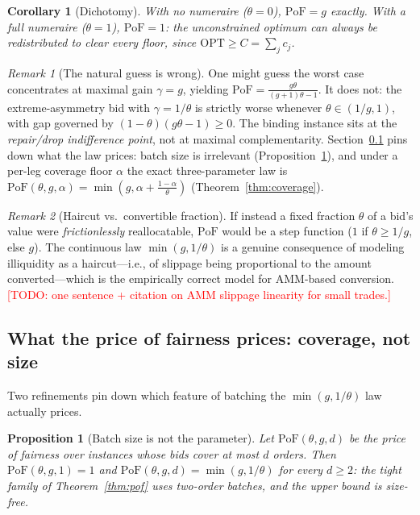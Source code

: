 \documentclass[11pt]{article}
\newcommand{\todo}[1]{\textcolor{red}{[TODO: #1]}}
\newtheorem{proposition}{Proposition}
\newtheorem{corollary}{Corollary}
\theoremstyle{remark}
\newtheorem{remark}{Remark}
\newcommand{\OPT}{\mathrm{OPT}}
\newcommand{\PoF}{\mathrm{PoF}}
\begin{document}
\begin{corollary}[Dichotomy]\label{cor:dichotomy}
With no numeraire ($\theta=0$), $\PoF=g$ exactly. With a full numeraire
($\theta=1$), $\PoF=1$: the unconstrained optimum can always be
redistributed to clear every floor, since $\OPT\ge C=\sum_j c_j$.
\end{corollary}

\begin{remark}[The natural guess is wrong]\label{rem:wrongguess}
One might guess the worst case concentrates at maximal gain $\gamma=g$,
yielding $\PoF=\frac{g\theta}{(g+1)\theta-1}$. It does not: the
extreme-asymmetry bid with $\gamma=1/\theta$ is strictly worse whenever
$\theta\in(1/g,1)$, with gap governed by $(1-\theta)(g\theta-1)\ge0$. The
binding instance sits at the \emph{repair/drop indifference point}, not at
maximal complementarity. Section~\ref{sec:coverage} pins down what the
law prices: batch size is irrelevant (Proposition~\ref{prop:dirrel}),
and under a per-leg coverage floor $\alpha$ the exact three-parameter
law is $\PoF(\theta,g,\alpha)=\min(g,\alpha+\frac{1-\alpha}{\theta})$
(Theorem~\ref{thm:coverage}).
\end{remark}

\begin{remark}[Haircut vs.\ convertible fraction]\label{rem:haircut}
If instead a fixed fraction $\theta$ of a bid's value were
\emph{frictionlessly} reallocatable, $\PoF$ would be a step function ($1$ if
$\theta\ge1/g$, else $g$). The continuous law $\min(g,1/\theta)$ is a
genuine consequence of modeling illiquidity as a haircut---i.e., of slippage
being proportional to the amount converted---which is the empirically
correct model for AMM-based conversion. \todo{one sentence + citation on
AMM slippage linearity for small trades.}
\end{remark}

\subsection{What the price of fairness prices: coverage, not size}
\label{sec:coverage}

Two refinements pin down which feature of batching the
$\min(g,1/\theta)$ law actually prices.

\begin{proposition}[Batch size is not the parameter]\label{prop:dirrel}
Let $\PoF(\theta,g,d)$ be the price of fairness over instances whose bids
cover at most $d$ orders. Then $\PoF(\theta,g,1)=1$ and
$\PoF(\theta,g,d)=\min(g,1/\theta)$ for every $d\ge2$: the tight family of
Theorem~\ref{thm:pof} uses two-order batches, and the upper bound is
size-free.
\end{proposition}
\end{document}
